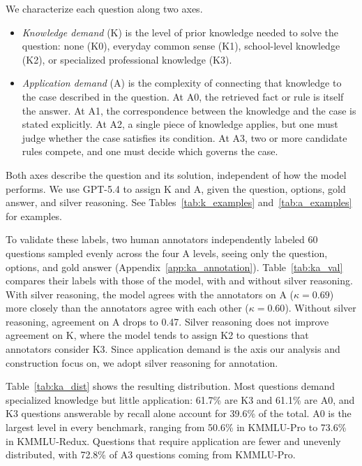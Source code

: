 We characterize each question along two axes.
\begin{itemize}[leftmargin=3.5mm, topsep=2pt, itemsep=2pt, parsep=0pt]
    \item[$\circ$] \textit{Knowledge demand} (K) is the level of prior knowledge needed to solve the question: none (K0), everyday common sense (K1), school-level knowledge (K2), or specialized professional knowledge (K3).
    \item[$\circ$] \textit{Application demand} (A) is the complexity of connecting that knowledge to the case described in the question. 
    At A0, the retrieved fact or rule is itself the answer. 
    At A1, the correspondence between the knowledge and the case is stated explicitly.
    At A2, a single piece of knowledge applies, but one must judge whether the case satisfies its condition.
    At A3, two or more candidate rules compete, and one must decide which governs the case.
\end{itemize}
Both axes describe the question and its solution, independent of how the model performs.
We use GPT-5.4 to assign K and A, given the question, options, gold answer, and silver reasoning.
See Tables~\ref{tab:k_examples} and~\ref{tab:a_examples} for examples.

To validate these labels, two human annotators independently labeled 60 questions sampled evenly across the four A levels, seeing only the question, options, and gold answer (Appendix~\ref{app:ka_annotation}).
Table~\ref{tab:ka_val} compares their labels with those of the model, with and without silver reasoning.
With silver reasoning, the model agrees with the annotators on A ($\kappa=0.69$) more closely than the annotators agree with each other ($\kappa=0.60$).
Without silver reasoning, agreement on A drops to 0.47. 
Silver reasoning does not improve agreement on K, where the model tends to assign K2 to questions that annotators consider K3. 
Since application demand is the axis our analysis and construction focus on, we adopt silver reasoning for annotation.



Table~\ref{tab:ka_dist} shows the resulting distribution.
Most questions demand specialized knowledge but little application:
61.7\% are K3 and 61.1\% are A0, and K3 questions answerable by recall alone account for 39.6\% of the total.
A0 is the largest level in every benchmark, ranging from 50.6\% in KMMLU-Pro to 73.6\% in KMMLU-Redux.
Questions that require application are fewer and unevenly distributed, with 72.8\% of A3 questions coming from KMMLU-Pro.

